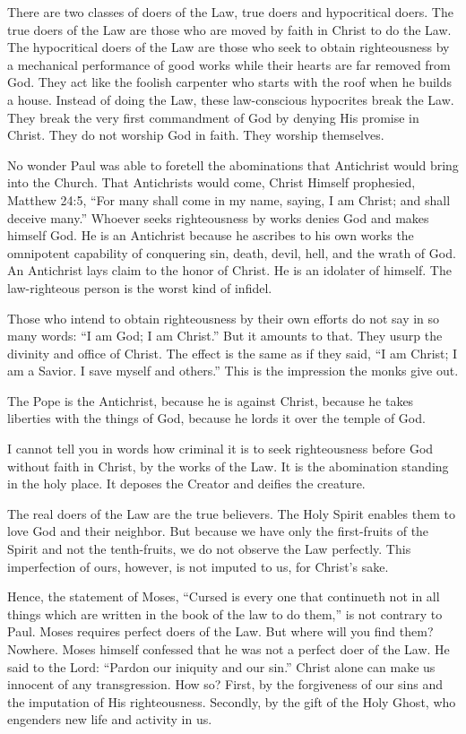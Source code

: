 There are two classes of doers of the Law, true doers and hypocritical doers. The true doers of the Law are those who are moved by faith in Christ to do the Law. The hypocritical doers of the Law are those who seek to obtain righteousness by a mechanical performance of good works while their hearts are far removed from God. They act like the foolish carpenter who starts with the roof when he builds a house. Instead of doing the Law, these law-conscious hypocrites break the Law. They break the very first commandment of God by denying His promise in Christ. They do not worship God in faith. They worship themselves.

No wonder Paul was able to foretell the abominations that Antichrist would bring into the Church. That Antichrists would come, Christ Himself prophesied, Matthew 24:5, “For many shall come in my name, saying, I am Christ; and shall deceive many.” Whoever seeks righteousness by works denies God and makes himself God. He is an Antichrist because he ascribes to his own works the omnipotent capability of conquering sin, death, devil, hell, and the wrath of God. An Antichrist lays claim to the honor of Christ. He is an idolater of himself. The law-righteous person is the worst kind of infidel.

Those who intend to obtain righteousness by their own efforts do not say in so many words: “I am God; I am Christ.” But it amounts to that. They usurp the divinity and office of Christ. The effect is the same as if they said, “I am Christ; I am a Savior. I save myself and others.” This is the impression the monks give out.

The Pope is the Antichrist, because he is against Christ, because he takes liberties with the things of God, because he lords it over the temple of God.

I cannot tell you in words how criminal it is to seek righteousness before God without faith in Christ, by the works of the Law. It is the abomination standing in the holy place. It deposes the Creator and deifies the creature.

The real doers of the Law are the true believers. The Holy Spirit enables them to love God and their neighbor. But because we have only the first-fruits of the Spirit and not the tenth-fruits, we do not observe the Law perfectly. This imperfection of ours, however, is not imputed to us, for Christ’s sake.

Hence, the statement of Moses, “Cursed is every one that continueth not in all things which are written in the book of the law to do them,” is not contrary to Paul. Moses requires perfect doers of the Law. But where will you find them? Nowhere. Moses himself confessed that he was not a perfect doer of the Law. He said to the Lord: “Pardon our iniquity and our sin.” Christ alone can make us innocent of any transgression. How so? First, by the forgiveness of our sins and the imputation of His righteousness. Secondly, by the gift of the Holy Ghost, who engenders new life and activity in us.

